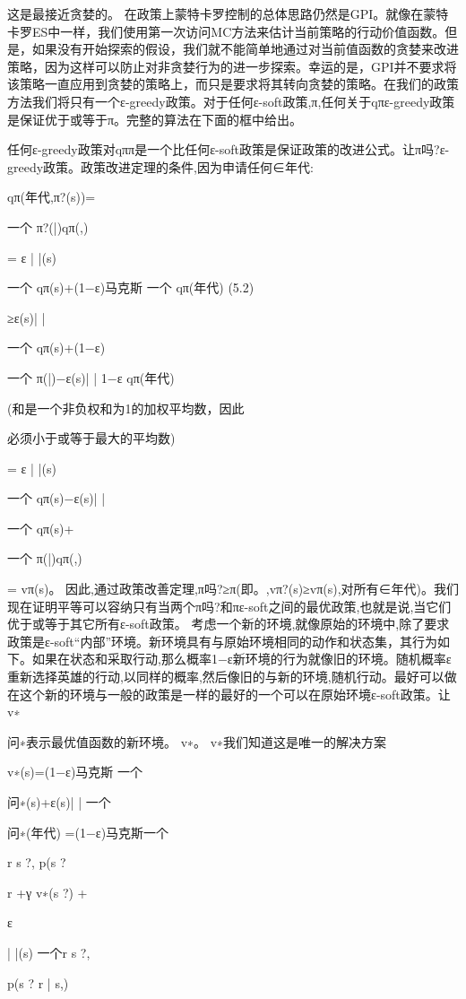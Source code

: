 这是最接近贪婪的。
在政策上蒙特卡罗控制的总体思路仍然是GPI。就像在蒙特卡罗ES中一样，我们使用第一次访问MC方法来估计当前策略的行动价值函数。但是，如果没有开始探索的假设，我们就不能简单地通过对当前值函数的贪婪来改进策略，因为这样可以防止对非贪婪行为的进一步探索。幸运的是，GPI并不要求将该策略一直应用到贪婪的策略上，而只是要求将其转向贪婪的策略。在我们的政策方法我们将只有一个ε-greedy政策。对于任何ε-soft政策,π,任何关于qπε-greedy政策是保证优于或等于π。完整的算法在下面的框中给出。
 

任何ε-greedy政策对qππ是一个比任何ε-soft政策是保证政策的改进公式。让π吗?ε-greedy政策。政策改进定理的条件,因为申请任何∈年代:

qπ(年代,π?(s))=

一个
π?(|)qπ(,)

=
ε
| |(s)

一个
qπ(s)+(1−ε)马克斯
一个
qπ(年代) 					(5.2)

≥ε(s)| |

一个
qπ(s)+(1−ε)

一个
π(|)−ε(s)| |
1−ε
qπ(年代)

(和是一个非负权和为1的加权平均数，因此

必须小于或等于最大的平均数)

=
ε
| |(s)

一个
qπ(s)−ε(s)| |

一个
qπ(s)+

一个
π(|)qπ(,)

= vπ(s)。
因此,通过政策改善定理,π吗?≥π(即。,vπ?(s)≥vπ(s),对所有∈年代)。我们现在证明平等可以容纳只有当两个π吗?和πε-soft之间的最优政策,也就是说,当它们优于或等于其它所有ε-soft政策。
考虑一个新的环境,就像原始的环境中,除了要求政策是ε-soft“内部”环境。新环境具有与原始环境相同的动作和状态集，其行为如下。如果在状态和采取行动,那么概率1−ε新环境的行为就像旧的环境。随机概率ε重新选择英雄的行动,以同样的概率,然后像旧的与新的环境,随机行动。最好可以做在这个新的环境与一般的政策是一样的最好的一个可以在原始环境ε-soft政策。让   v∗

问∗表示最优值函数的新环境。
v∗。
v∗我们知道这是唯一的解决方案

v∗(s)=(1−ε)马克斯
一个

问∗(s)+ε(s)| |
一个

问∗(年代)
=(1−ε)马克斯一个

r s ?,  p(s ?


r +γ
v∗(s ?)
+

ε

| |(s)
一个r s ?,

p(s ?  r | s,)

